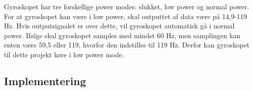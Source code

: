 Gyroskopet har tre forskellige power modes: slukket, low power og normal power. For at gyroskopet kan være i low power, skal outputtet af data være på 14,9-119 Hz. Hvis outputsignalet er over dette, vil gyroskopet automatisk gå i normal power. Ifølge  skal gyroskopet samples med mindst 60 Hz, men samplingen kan enten være 59,5 eller 119, hvorfor den indstilles til 119 Hz. Derfor kan gyroskopet til dette projekt køre i low power mode. \citep{STMicroelectronics2016}
\subsection{Implementering}





%

